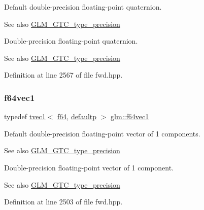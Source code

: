 Default double-\/precision floating-\/point quaternion. \begin{DoxySeeAlso}{See also}
\mbox{\hyperlink{group__gtc__type__precision}{G\+L\+M\+\_\+\+G\+T\+C\+\_\+type\+\_\+precision}}
\end{DoxySeeAlso}
Double-\/precision floating-\/point quaternion. \begin{DoxySeeAlso}{See also}
\mbox{\hyperlink{group__gtc__type__precision}{G\+L\+M\+\_\+\+G\+T\+C\+\_\+type\+\_\+precision}} 
\end{DoxySeeAlso}


Definition at line 2567 of file fwd.\+hpp.

\mbox{\label{group__gtc__type__precision_ga4c945cd13adbebd25ea3df003efb92ef}} 
\subsubsection{\texorpdfstring{f64vec1}{f64vec1}}
{\footnotesize\ttfamily typedef \mbox{\hyperlink{structglm_1_1tvec1}{tvec1}}$<$ \mbox{\hyperlink{group__gtc__type__precision_ga2bba392e555124b36cde6abba349bab3}{f64}}, \mbox{\hyperlink{namespaceglm_a0f04f086094c747d227af4425893f545a9d21ccd8b5a009ec7eb7677befc3bf51}{defaultp}} $>$ \mbox{\hyperlink{group__gtc__type__precision_ga4c945cd13adbebd25ea3df003efb92ef}{glm\+::f64vec1}}}

Default double-\/precision floating-\/point vector of 1 components. \begin{DoxySeeAlso}{See also}
\mbox{\hyperlink{group__gtc__type__precision}{G\+L\+M\+\_\+\+G\+T\+C\+\_\+type\+\_\+precision}}
\end{DoxySeeAlso}
Double-\/precision floating-\/point vector of 1 component. \begin{DoxySeeAlso}{See also}
\mbox{\hyperlink{group__gtc__type__precision}{G\+L\+M\+\_\+\+G\+T\+C\+\_\+type\+\_\+precision}} 
\end{DoxySeeAlso}


Definition at line 2503 of file fwd.\+hpp.

\mbox{\label{group__gtc__type__precision_gacde4fe7b129521888cd30672c34650c5}} 
